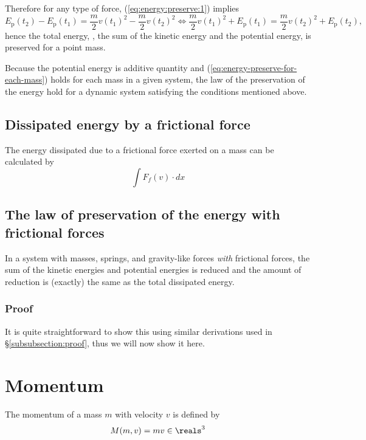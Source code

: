 \documentclass[12pt]{article}
\begin{document}
Therefore for any type of force,
(\ref{eq:energy:preserve:1})
implies
\begin{equation}
\label{eq:energy-preserve-for-each-mass}
E_\mathrm{p}(t_2) - E_\mathrm{p}(t_1)
=
\frac{m}{2} v(t_1)^2
- \frac{m}{2}v(t_2)^2
\Leftrightarrow
\frac{m}{2} v(t_1)^2 + E_\mathrm{p}(t_1)
=
\frac{m}{2} v(t_2)^2 + E_\mathrm{p}(t_2),
\end{equation}
hence the total energy,
\ie,
the sum of the kinetic energy and the potential energy,
is preserved for a point mass.

Because the potential energy is additive quantity
and (\ref{eq:energy-preserve-for-each-mass})
holds for each mass in a given system,
the law of the preservation of the energy hold
for a dynamic system satisfying the conditions mentioned above.


\subsection{Dissipated energy by a frictional force}

The energy dissipated due to a frictional force exerted on a mass
can be calculated by
\begin{equation}
\int F_f(v) \cdot dx
\end{equation}

\subsection{The law of preservation of the energy with frictional forces}

In a system with masses, springs, and gravity-like forces \emph{with} frictional forces,
the sum of the kinetic energies and potential energies is reduced
and the amount of reduction is (exactly) the same as the total dissipated energy.

\subsubsection{Proof}

It is quite straightforward to show this using similar derivations
used in \S\ref{subsubsection:proof},
thus we will now show it here.


\section{Momentum}

The momentum of a mass $m$ with velocity $v$ is defined by
\begin{equation}
M(m,v) = mv \in\reals^3
\end{equation}
\end{document}
